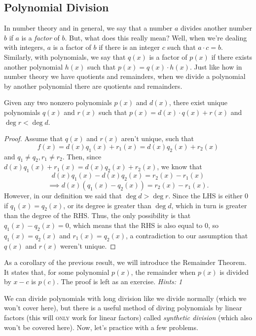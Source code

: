 \documentclass[12pt]{article}
\begin{document}
\subsection{Polynomial Division}
In number theory and in general, we say that a number $a$ divides another number $b$ if $a$ is a \textit{factor} of $b$. But, what does this really mean? Well, when we're dealing with integers, $a$ is a factor of $b$ if there is an integer $c$ such that $a\cdot c = b$. Similarly, with polynomials, we say that $q(x)$ is a factor of $p(x)$ if there exists another polynomial $h(x)$ such that $p(x)=q(x)\cdot h(x)$. Just like how in number theory we have quotients and remainders, when we divide a polynomial by another polynomial there are quotients and remainders. 
\begin{tcolorbox}[colback=green!10!white, colframe=green!25!black, title=Quotients and Remainders of Polynomials]
    Given any two nonzero polynomials $p(x)$ and $d(x)$, there exist unique polynomials $q(x)$ and $r(x)$ such that $p(x)=d(x)\cdot q(x)+r(x)$ and $\deg r<\deg d$.
    \begin{proof}
        Assume that $q(x)$ and $r(x)$ aren't unique, such that 
        \[
            f(x)=d(x)q_1(x)+r_1(x)=d(x)q_2(x)+r_2(x)
        \]
        and $q_1\not= q_2, r_1\not= r_2$. Then, since $d(x)q_1(x)+r_1(x)=d(x)q_2(x)+r_2(x)$, we know that 
        \[
            d(x)q_1(x)-d(x)q_2(x) = r_2(x)-r_1(x)
        \]
        \[
            \implies d(x)\left(q_1(x)-q_2(x)\right)=r_2(x)-r_1(x).
        \]
        However, in our definition we said that $\deg d > \deg r$. Since the LHS is either $0$ if $q_1(x)=q_2(x)$, or its degree is greater than $\deg d$, which in turn is greater than the degree of the RHS. Thus, the only possibility is that $q_1(x)-q_2(x)=0$, which means that the RHS is also equal to $0$, so $q_1(x)=q_2(x)$ and $r_1(x)=q_2(x)$, a contradiction to our assumption that $q(x)$ and $r(x)$ weren't unique. 
        
    \end{proof}
        \begin{tcolorbox}[colback=blue!10!white, colframe=blue!50!black, title=Remainder Theorem]
            As a corollary of the previous result, we will introduce the Remainder Theorem. It states that, for some polynomial $p(x)$, the remainder when $p(x)$ is divided by $x-c$ is $p(c)$. The proof is left as an exercise. \textit{Hints: 1}
        \end{tcolorbox}
\end{tcolorbox}
We can divide polynomials with long division like we divide normally (which we won't cover here), but there is a useful method of diving polynomials by linear factors (this will \textsc{only} work for linear factors) called \textit{synthetic division} (which also won't be covered here). Now, let's practice with a few problems.\\\\
\end{document}

